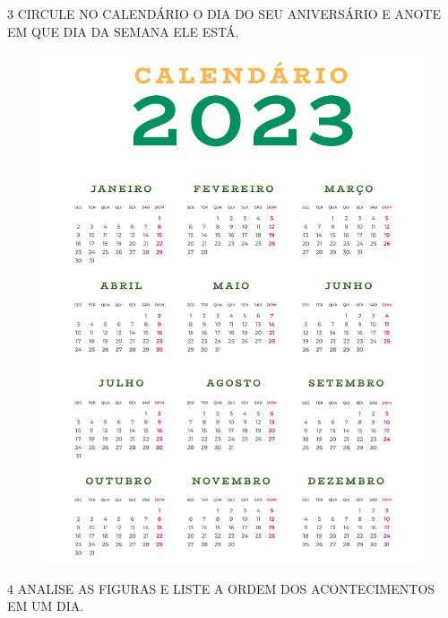 
\num{3} CIRCULE NO CALENDÁRIO O DIA DO SEU ANIVERSÁRIO E ANOTE EM QUE DIA DA SEMANA ELE ESTÁ.


\begin{figure}[H]
\centering
\includegraphics[width=\textwidth]{./media/SAEB_1ANO_MAT_FIGURA51.png}
\end{figure}


\num{4} ANALISE AS FIGURAS E LISTE A ORDEM DOS ACONTECIMENTOS EM UM DIA.

